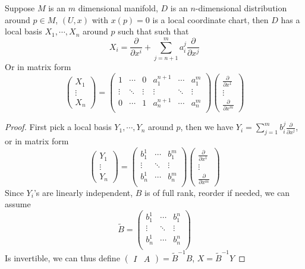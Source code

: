 \documentclass[../main.tex]{subfiles}
\begin{document}
\begin{lemma}\label{Lemma for Frobenius theorem}
Suppose $M$ is an $m$ dimensional manifold, $D$ is an $n$-dimensional distribution around $p\in M$, $(U,x)$ with $x(p)=0$ is a local coordinate chart, then $D$ has a local basis $X_1,\cdots,X_n$ around $p$ such that such that
\[X_i=\frac{\partial}{\partial x^i}+\sum_{j=n+1}^ma^j_i\frac{\partial}{\partial x^j}\]
Or in matrix form
\[\begin{pmatrix}
X_1 \\
\vdots \\
X_n
\end{pmatrix}=\begin{pmatrix}
1&\cdots&0&a^{n+1}_1&\cdots&a^m_1 \\
\vdots&\ddots&\vdots&\vdots&\ddots&\vdots \\
0&\cdots&1&a^{n+1}_n&\cdots&a^m_n \\
\end{pmatrix}\begin{pmatrix}
\frac{\partial}{\partial x^1} \\
\vdots \\
\frac{\partial}{\partial x^m}
\end{pmatrix}\]
\end{lemma}

\begin{proof}
First pick a local basis $Y_1,\cdots,Y_n$ around $p$, then we have $\displaystyle Y_i=\sum_{j=1}^mb^j_i\frac{\partial}{\partial x^j}$, or in matrix form
\[\begin{pmatrix}
Y_1 \\
\vdots \\
Y_n
\end{pmatrix}=\begin{pmatrix}
b^{1}_1&\cdots&b^m_1 \\
\vdots&\ddots&\vdots \\
b^{1}_n&\cdots&b^m_n \\
\end{pmatrix}\begin{pmatrix}
\frac{\partial}{\partial x^1} \\
\vdots \\
\frac{\partial}{\partial x^m}
\end{pmatrix}\]
Since $Y_i$'s are linearly independent, $B$ is of full rank, reorder if needed, we can assume
\[\widetilde B=\begin{pmatrix}
b^{1}_1&\cdots&b^n_1 \\
\vdots&\ddots&\vdots \\
b^{1}_n&\cdots&b^n_n \\
\end{pmatrix}\]
Is invertible, we can thus define $\begin{pmatrix}
I& A
\end{pmatrix}=\widetilde B^{-1}B$, $X=\widetilde B^{-1}Y$
\end{proof}
\end{document}
